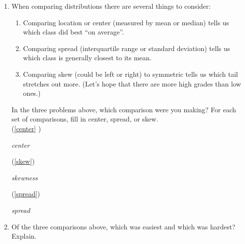 \begin{enumerate}
  \item  When comparing distributions there are several things to consider:
    \begin{enumerate}
    \item  Comparing location or center (measured by mean or median)
      tells us which class did best ``on average''. 
    \item  Comparing spread (interquartile range or standard
      deviation) tells us which class is generally closest to its mean.
    \item  Comparing skew (could be left or right) to symmetric tells
      us which tail stretches out more.
      (Let's hope that there are more high grades than low ones.) 
    \end{enumerate}
    In the three problems above, which comparison were you making?
    For each set of comparisons, fill in center, spread, or skew. \\
    (\ref{center} )
\begin{students}
\underline{\hspace*{3cm}}\hfill 
\end{students}
\begin{key}
  \underline{\hspace*{1cm}}  {\it  center} \underline{\hspace*{1cm}}\hfill 
\end{key} 
    (\ref{skew}) 
\begin{students}
   \underline{\hspace*{3cm}}\hfill 
\end{students}
\begin{key}
  \underline{\hspace*{1cm}}  {\it  skewness} \underline{\hspace*{1cm}}\hfill 
\end{key}
    (\ref{spread}) 
\begin{students}
  \underline{\hspace*{3cm}}\hfill 
\end{students}
\begin{key}
  \underline{\hspace*{1cm}}  {\it spread} \underline{\hspace*{1cm}}\hfill 
\end{key}
  \item   Of the three comparisons above, which was easiest and which
    was hardest? Explain. 
\begin{students}
    \newpage
\end{students}


\end{enumerate}
